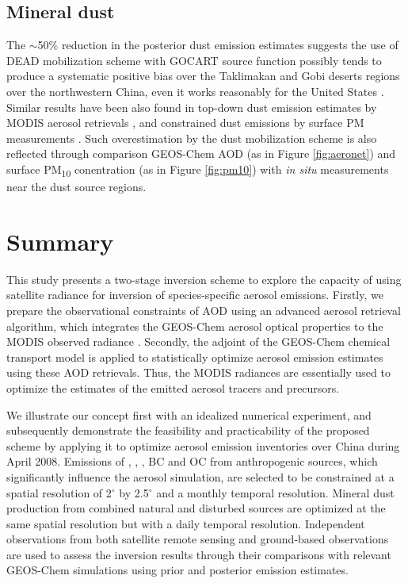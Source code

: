  \subsection{Mineral dust} 

  The $\sim$50\% reduction in the posterior dust emission estimates suggests 
the use of DEAD mobilization scheme with GOCART source function possibly tends
to produce a systematic positive bias over the Taklimakan and Gobi deserts 
regions over the northwestern China, even it works reasonably for the United 
States \citep{Fairlie07}. Similar results have been also found in top-down 
dust emission estimates by MODIS aerosol retrievals \citep{Wang12}, 
and constrained dust emissions by surface PM measurements \citep{Ku11}. 
Such overestimation by the dust mobilization scheme is also reflected through
comparison GEOS-Chem AOD (as in Figure \ref{fig:aeronet}) and surface 
PM\textsubscript{10} conentration (as in Figure \ref{fig:pm10}) with
\textit{in situ} measurements near the dust source regions. 


\section{Summary} \label{sec:invsummary}

 This study presents a two-stage inversion scheme to explore the capacity of 
using satellite radiance for inversion of species-specific aerosol emissions.
Firstly, we prepare the observational constraints of AOD using an advanced 
aerosol retrieval algorithm, which integrates the GEOS-Chem aerosol optical 
properties to the MODIS observed radiance \citep{Wang10}.
Secondly, the adjoint of the GEOS-Chem chemical transport model is applied to 
statistically optimize aerosol emission estimates using these AOD retrievals.
Thus, the MODIS radiances are essentially used to optimize the estimates of 
the emitted aerosol tracers and precursors.

We illustrate our concept first with an idealized numerical experiment,
 and subsequently demonstrate the feasibility and practicability of the 
proposed scheme by applying it to optimize aerosol emission inventories over
China during April 2008. Emissions of , , , BC and OC 
from anthropogenic sources, which significantly influence the aerosol 
simulation, are selected to be constrained at a spatial resolution of 
2$^{\circ}$ by 2.5$^{\circ}$ and a monthly temporal resolution.
Mineral dust production from combined natural and disturbed sources are 
optimized at the same spatial resolution but with a daily temporal resolution.
Independent observations from both satellite remote sensing and ground-based 
observations are used to assess the inversion results through their 
comparisons with relevant GEOS-Chem simulations using prior and posterior 
emission estimates. 

